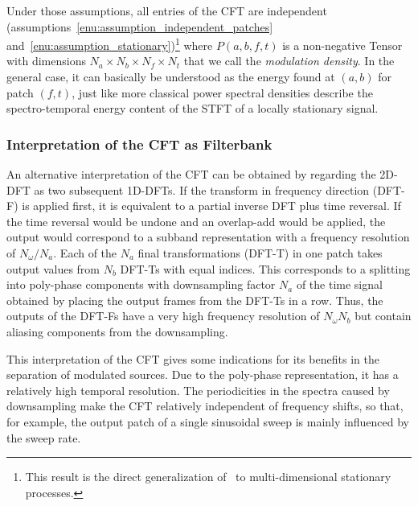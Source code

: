 Under those assumptions, all entries of the CFT are independent (assumptions~\ref{enu:assumption_independent_patches} and~\ref{enu:assumption_stationary})\footnote{This result is the direct generalization of~\cite[th. 6.5.1]{samoradnitsky94} to multi-dimensional stationary processes.} where $P\left(a,b,f,t\right)$ is a non-negative Tensor with dimensions $N_{a}\times N_{b}\times N_{f}\times N_{t}$ that we call the \emph{modulation density}. 
In the general case, it can basically be understood as the energy found at $\left(a,b\right)$ for patch $\left(f,t\right)$, just like more classical power spectral densities describe the spectro-temporal energy content of the \acs{STFT} of a locally stationary signal.

\subsubsection{Interpretation of the CFT as Filterbank}
\label{sub:interpretation}

An alternative interpretation of the CFT can be obtained by regarding the 2D-DFT as two subsequent 1D-DFTs. 
If the transform in frequency direction (DFT-F) is applied first, it is equivalent to a partial inverse DFT plus time reversal. 
If the time reversal would be undone and an overlap-add would be applied, the output would correspond to a subband representation with a frequency resolution of $N_\omega / N_a$. 
Each of the $N_a$ final transformations (DFT-T) in one patch takes output values from $N_b$ DFT-Ts with equal indices. 
This corresponds to a splitting into poly-phase components with downsampling factor $N_a$ of the time signal obtained by placing the output frames from the DFT-Ts in a row.
Thus, the outputs of the DFT-Fs have a very high frequency resolution of $N_\omega N_b$ but contain aliasing components from the downsampling.
\par
This interpretation of the CFT gives some indications for its benefits in the separation of modulated sources. 
Due to the poly-phase representation, it has a relatively high temporal resolution. 
The periodicities in the spectra caused by downsampling make the CFT relatively independent of frequency shifts, so that, for example, the output patch of a single sinusoidal sweep is mainly influenced by the sweep rate.

